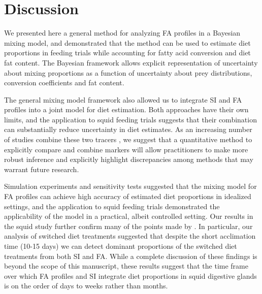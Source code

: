 \documentclass[fleqn,10pt]{wlpeerj}
\begin{document}
\section*{Discussion}

We presented here a general method for analyzing FA profiles in a Bayesian mixing
model, and demonstrated that the method can be used to estimate diet proportions
in feeding trials while accounting for fatty acid conversion and diet
fat content. The Bayesian framework allows explicit representation of
uncertainty about mixing proportions as a function of uncertainty
about prey distributions, conversion coefficients and fat content.

The general mixing model framework also allowed us to integrate SI and
FA profiles into a joint model for diet estimation. Both approaches have their
own limits, and the application to squid feeding trials suggests that their combination can substantially reduce uncertainty in diet estimates. As an increasing number of studies combine
these two tracers \citep{tucker_convergence_2008,guest_evidence_2008,guest_trophic_2009,stowasser_experimental_2006,van_der_bank_dietary_2011,jaschinski_carbon_2008},
we suggest that a quantitative method to explicitly compare and combine
markers will allow practitioners to make more robust inference and
explicitly highlight discrepancies among methods that may warrant
future research.

Simulation experiments and sensitivity tests suggested that the mixing model for FA profiles can
achieve high accuracy of estimated diet proportions in idealized
settings, and the application to squid feeding trials demonstrated the
applicability of the model in a practical, albeit controlled setting. Our results in the
squid study further confirm many of the points made by
\citet{stowasser_experimental_2006}. In particular,  our analysis of switched diet treatments suggested
that despite the short acclimation time (10-15 days) we can detect
dominant proportions of the switched diet treatments from both SI and
FA. While a complete discussion of these findings is beyond the scope
of this manuscript, these results suggest that the time frame over
which FA profiles and SI integrate diet proportions in squid digestive glands is on the order of days to
weeks rather than months.
\end{document}
